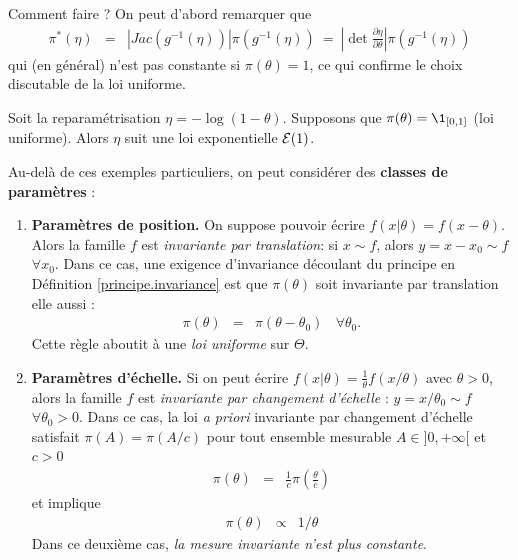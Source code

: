 Comment faire ? On peut d'abord remarquer que
\begin{eqnarray*}
\pi^*(\eta)  & = & \left|Jac(g^{-1}(\eta))\right| \pi(g^{-1}(\eta)) \ = \ \left| \det \frac{\partial \eta}{\partial \theta}\right| \pi(g^{-1}(\eta))
\end{eqnarray*} 
qui (en général) n'est pas constante si $\pi(\theta)= 1$, ce qui confirme le choix discutable de la loi uniforme. \\

\begin{exo}
Soit la reparamétrisation $\eta=-\log(1-\theta)$. Supposons que $\pi(\theta)=\1_{[0,1]}$ (loi uniforme). Alors $\eta$ suit une loi exponentielle ${\cal{E}}(1)$. \\
\end{exo}

\noindent Au-delà de ces exemples particuliers, on peut considérer des {\bf classes de paramètres} : 
\begin{enumerate}
    \item {\bf Paramètres de position.} On suppose pouvoir écrire {$f(x|\theta) = f(x-\theta)$}. Alors la famille $f$ est {\it invariante par translation}: si $x\sim f$, alors $y=x-x_0 \sim f$ $\forall x_0$. Dans ce cas, une exigence d'invariance découlant du principe en Définition \ref{principe.invariance} est que $\pi(\theta)$ soit invariante par translation elle aussi :
\begin{eqnarray*}
\pi(\theta) & = & \pi(\theta-\theta_0) \ \ \ \ \forall \theta_0.
\end{eqnarray*}
Cette règle aboutit à une \emph{loi uniforme} sur $\Theta$. 
 
    \item {\bf Paramètres d'échelle.} Si on peut écrire {$f(x|\theta)=\frac{1}{\theta}f(x/\theta)$} avec $\theta>0$, alors la famille $f$ est {\it invariante par changement d'échelle} : $y=x/\theta_0 \sim f$ $\forall \theta_0>0$. Dans ce cas, la loi {\it a priori} invariante par changement d'échelle satisfait $\pi(A)=\pi(A/c)$ pour tout ensemble mesurable $A\in]0,+\infty[$ et $c>0$
\begin{eqnarray*}
\pi(\theta) & = & \frac{1}{c}\pi\left(\frac{\theta}{c}\right)
\end{eqnarray*}
et implique
\begin{eqnarray*}
\pi(\theta) & \propto & 1/\theta
\end{eqnarray*}
Dans ce deuxième cas, \emph{la mesure invariante n'est plus constante}. \\ 
\end{enumerate}

